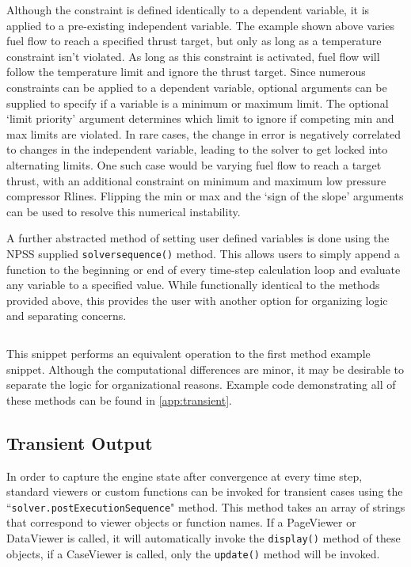 \documentclass[heading.tex]{subfiles}
\begin{document}
 \begin{adjustwidth}{1cm}{-1cm}
 \inputminted[]{c++}{code/constraintSetup}
 \end{adjustwidth} 
 
Although the constraint is defined identically to a dependent variable, it is applied to a pre-existing independent variable.
The example shown above varies fuel flow to reach a specified thrust target, but only as long as a temperature constraint isn't violated.
As long as this constraint is activated, fuel flow will follow the temperature limit and ignore the thrust target.
Since numerous constraints can be applied to a dependent variable,
optional arguments can be supplied to specify if a variable is a minimum or maximum limit.
The optional `limit priority' argument determines which limit to ignore if competing min and max limits are violated.
In rare cases, the change in error is negatively correlated to changes in the independent variable,
leading to the solver to get locked into alternating limits. One such case would be varying fuel flow to reach a target thrust,
with an additional constraint on minimum and maximum low pressure compressor Rlines.
Flipping the min or max and the `sign of the slope' arguments can be used to resolve this numerical instability.

A further abstracted method of setting user defined variables is done using the NPSS supplied \texttt{solversequence()} method.
This allows users to simply append a function to the beginning or end of every time-step calculation loop
and evaluate any variable to a specified value. While functionally identical to the methods provided above,
this provides the user with another option for organizing logic and separating concerns.
 
 \begin{adjustwidth}{-1cm}{-1cm}
 \inputminted[]{c++}{code/solverSequence}
 \end{adjustwidth} 
 
This snippet performs an equivalent operation to the first method example snippet.
Although the computational differences are minor, it may be desirable to separate the logic for organizational reasons.
Example code demonstrating all of these methods can be found in \cref{app:transient}.

\subsection{Transient Output}

In order to capture the engine state after convergence at every time step, standard viewers or custom functions can be
invoked for transient cases using the ``\texttt{solver.postExecutionSequence}" method. This method takes an array of strings that
correspond to viewer objects or function names. If a PageViewer or DataViewer is called, it will automatically invoke the
\texttt{display()} method of these objects, if a CaseViewer is called, only the \texttt{update()} method will be invoked.
\end{document}
